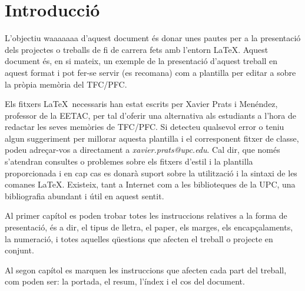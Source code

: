 \cleardoublepage
{}
\chapter*{Introducció}
L'objectiu waaaaaaa d'aquest document és donar unes pautes per a la presentació dels projectes o treballs de fi de carrera fets amb l'entorn \LaTeX. Aquest document és, en si mateix, un exemple de la presentació d'aquest treball en aquest format i pot fer-se servir (es recomana) com a plantilla per editar a sobre la pròpia memòria del TFC/PFC.

Els fitxers \LaTeX \ necessaris han estat escrits per Xavier Prats i Menéndez, professor de la EETAC, per tal d'oferir una alternativa als estudiants a l'hora de redactar les seves memòries de TFC/PFC. Si detecteu qualsevol error o teniu algun suggeriment per millorar aquesta plantilla i el corresponent fitxer de classe, podeu adreçar-vos a directament a \emph{xavier.prats@upc.edu}. Cal dir, que només s'atendran consultes o problemes sobre els fitxers d'estil i la plantilla proporcionada i en cap cas es donarà suport sobre la utilització i la sintaxi de les comanes \LaTeX. Existeix, tant a Internet com a les biblioteques de la UPC, una  bibliografia abundant i útil en aquest sentit. 

Al primer capítol es poden trobar totes les instruccions relatives a la forma de presentació, és a dir, el tipus de lletra, el paper, els marges, els encapçalaments, la numeració, i totes aquelles qüestions que afecten el treball o projecte en conjunt.

Al segon capítol es marquen les instruccions que afecten cada part del treball, com poden ser: la portada, el resum, l'índex i el cos del document.
